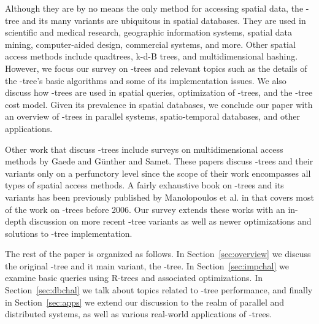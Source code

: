 Although they are by no means the only method for accessing spatial data, the \rbase-tree and 
its many variants are ubiquitous in spatial databases. They are 
used in scientific and medical research, geographic information systems, spatial data mining, 
computer-aided design, commercial systems, and more. Other spatial access methods include 
quadtrees, k-d-B trees, and multidimensional hashing\cite{samet95, gaedegunther98}.
However, we focus our survey on \rbase-trees and relevant topics such as the details of 
the \rbase-tree's basic algorithms and some of its implementation issues. We also discuss 
how \rbase-trees are used in spatial queries, optimization of \rbase-trees, and the 
\rbase-tree cost model. Given its prevalence in spatial databases, we conclude our paper with 
an overview of \rbase-trees in parallel systems, spatio-temporal databases, and other applications. 

Other work that discuss \rbase-trees include surveys on multidimensional access methods
by Gaede and G\"{u}nther \cite{gaedegunther98} and Samet\cite{samet95}. These papers
discuss \rbase-trees and their variants only on a perfunctory level since the scope of their 
work encompasses all types of spatial access methods. A fairly exhaustive book on 
\rbase-trees and its variants has been previously published by Manolopoulos et al.
in \cite{thebook} that covers most of the work on \rbase-trees before 2006. Our survey 
extends these works with an in-depth discussion on more recent \rbase-tree variants as 
well as newer optimizations and solutions to \rbase-tree implementation.

The rest of the paper is organized as follows. In Section~\ref{sec:overview} we discuss the
original \rbase-tree and it main variant, the \rstar-tree. In Section~\ref{sec:impchal}
we examine basic queries using R-trees and associated optimizations. In 
Section~\ref{sec:dbchal} we talk about topics related to \rbase-tree performance, and 
finally in Section~\ref{sec:apps} we extend our discussion to the realm of parallel and
distributed systems, as well as various real-world applications of \rbase-trees.


